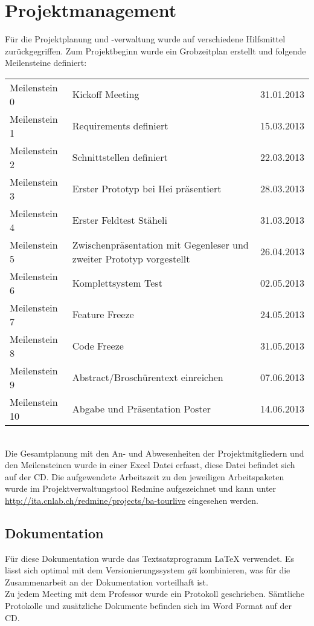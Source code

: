 \section{Projektmanagement}
Für die Projektplanung und -verwaltung wurde auf verschiedene Hilfsmittel zurückgegriffen. Zum Projektbeginn wurde ein Grobzeitplan erstellt und folgende Meilensteine definiert:

\begin{tabular}{p{2.8cm}p{7.5cm}r}
Meilenstein 0 & Kickoff Meeting & 31.01.2013\\
Meilenstein 1 & Requirements definiert & 15.03.2013\\
Meilenstein 2 & Schnittstellen definiert & 22.03.2013\\
Meilenstein 3 & Erster Prototyp bei Hei präsentiert & 28.03.2013\\
Meilenstein 4 & Erster Feldtest Stäheli & 31.03.2013\\
Meilenstein 5 & Zwischenpräsentation mit Gegenleser und zweiter Prototyp vorgestellt & 26.04.2013\\
Meilenstein 6 & Komplettsystem Test & 02.05.2013\\
Meilenstein 7 & Feature Freeze & 24.05.2013\\
Meilenstein 8 & Code Freeze & 31.05.2013\\
Meilenstein 9 & Abstract/Broschürentext einreichen & 07.06.2013\\
Meilenstein 10 & Abgabe und Präsentation Poster & 14.06.2013\\
\end{tabular}
\\

Die Gesamtplanung mit den An- und Abwesenheiten der Projektmitgliedern und den Meilensteinen wurde in einer Excel Datei erfasst, diese Datei befindet sich auf der CD. Die aufgewendete Arbeitszeit zu den jeweiligen Arbeitspaketen wurde im Projektverwaltungstool Redmine aufgezeichnet und kann unter \url{http://ita.cnlab.ch/redmine/projects/ba-tourlive} eingesehen werden.
\\

\subsection{Dokumentation}
Für diese Dokumentation wurde das Textsatzprogramm {\LaTeX} verwendet. Es lässt sich optimal mit dem Versionierungssystem \textit{\gls{git}} kombinieren, was für die Zusammenarbeit an der Dokumentation vorteilhaft ist.
\\

Zu jedem Meeting mit dem Professor wurde ein Protokoll geschrieben. Sämtliche Protokolle und zusätzliche Dokumente befinden sich im Word Format auf der CD.